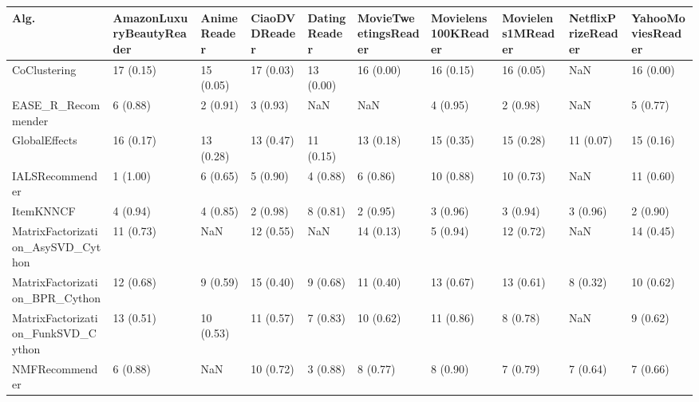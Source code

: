 \begin{tabular}{llllllllll}
\toprule
                               Alg. & AmazonLuxuryBeautyReader & AnimeReader & CiaoDVDReader & DatingReader & MovieTweetingsReader & Movielens100KReader & Movielens1MReader & NetflixPrizeReader & YahooMoviesReader \\
\midrule
                       CoClustering &                17 (0.15) &   15 (0.05) &     17 (0.03) &    13 (0.00) &            16 (0.00) &           16 (0.15) &         16 (0.05) &                NaN &         16 (0.00) \\
                 EASE\_R\_Recommender &                 6 (0.88) &    2 (0.91) &      3 (0.93) &          NaN &                  NaN &            4 (0.95) &          2 (0.98) &                NaN &          5 (0.77) \\
                      GlobalEffects &                16 (0.17) &   13 (0.28) &     13 (0.47) &    11 (0.15) &            13 (0.18) &           15 (0.35) &         15 (0.28) &          11 (0.07) &         15 (0.16) \\
                    IALSRecommender &                 1 (1.00) &    6 (0.65) &      5 (0.90) &     4 (0.88) &             6 (0.86) &           10 (0.88) &         10 (0.73) &                NaN &         11 (0.60) \\
                          ItemKNNCF &                 4 (0.94) &    4 (0.85) &      2 (0.98) &     8 (0.81) &             2 (0.95) &            3 (0.96) &          3 (0.94) &           3 (0.96) &          2 (0.90) \\
  MatrixFactorization\_AsySVD\_Cython &                11 (0.73) &         NaN &     12 (0.55) &          NaN &            14 (0.13) &            5 (0.94) &         12 (0.72) &                NaN &         14 (0.45) \\
     MatrixFactorization\_BPR\_Cython &                12 (0.68) &    9 (0.59) &     15 (0.40) &     9 (0.68) &            11 (0.40) &           13 (0.67) &         13 (0.61) &           8 (0.32) &         10 (0.62) \\
 MatrixFactorization\_FunkSVD\_Cython &                13 (0.51) &   10 (0.53) &     11 (0.57) &     7 (0.83) &            10 (0.62) &           11 (0.86) &          8 (0.78) &                NaN &          9 (0.62) \\
                     NMFRecommender &                 6 (0.88) &         NaN &     10 (0.72) &     3 (0.88) &             8 (0.77) &            8 (0.90) &          7 (0.79) &           7 (0.64) &          7 (0.66) \\

\end{tabular}
